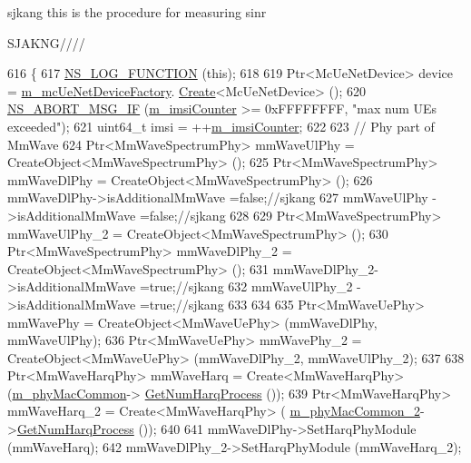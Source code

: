 sjkang this is the procedure for measuring sinr

S\+J\+A\+K\+N\+G//// 
\begin{DoxyCode}
616 \{
617         \hyperlink{log-macros-disabled_8h_a90b90d5bad1f39cb1b64923ea94c0761}{NS\_LOG\_FUNCTION} (\textcolor{keyword}{this});
618 
619         Ptr<McUeNetDevice> device = \hyperlink{classns3_1_1MmWaveHelper_a678f7c6a79f1024bf09a2dc561ae87f5}{m\_mcUeNetDeviceFactory}.
      \hyperlink{classns3_1_1ObjectFactory_a18152e93f0a6fe184ed7300cb31e9896}{Create}<McUeNetDevice> ();
620         \hyperlink{group__fatal_ga6653324225bc139e46deea177614ceee}{NS\_ABORT\_MSG\_IF} (\hyperlink{classns3_1_1MmWaveHelper_a72100c1c951aa5dcc5b634749e2bb930}{m\_imsiCounter} >= 0xFFFFFFFF, \textcolor{stringliteral}{"max num UEs exceeded"});
621         uint64\_t imsi = ++\hyperlink{classns3_1_1MmWaveHelper_a72100c1c951aa5dcc5b634749e2bb930}{m\_imsiCounter};
622 
623         \textcolor{comment}{// Phy part of MmWave}
624         Ptr<MmWaveSpectrumPhy> mmWaveUlPhy = CreateObject<MmWaveSpectrumPhy> ();
625         Ptr<MmWaveSpectrumPhy> mmWaveDlPhy = CreateObject<MmWaveSpectrumPhy> ();
626          mmWaveDlPhy->isAdditionalMmWave =\textcolor{keyword}{false};\textcolor{comment}{//sjkang}
627            mmWaveUlPhy ->isAdditionalMmWave =\textcolor{keyword}{false};\textcolor{comment}{//sjkang}
628 
629         Ptr<MmWaveSpectrumPhy> mmWaveUlPhy\_2 = CreateObject<MmWaveSpectrumPhy> ();
630         Ptr<MmWaveSpectrumPhy> mmWaveDlPhy\_2 = CreateObject<MmWaveSpectrumPhy> ();
631    mmWaveDlPhy\_2->isAdditionalMmWave =\textcolor{keyword}{true};\textcolor{comment}{//sjkang}
632     mmWaveUlPhy\_2 ->isAdditionalMmWave =\textcolor{keyword}{true};\textcolor{comment}{//sjkang}
633 
634 
635         Ptr<MmWaveUePhy> mmWavePhy = CreateObject<MmWaveUePhy> (mmWaveDlPhy, mmWaveUlPhy);
636         Ptr<MmWaveUePhy> mmWavePhy\_2 = CreateObject<MmWaveUePhy> (mmWaveDlPhy\_2, mmWaveUlPhy\_2); 
637 
638         Ptr<MmWaveHarqPhy> mmWaveHarq = Create<MmWaveHarqPhy> (\hyperlink{classns3_1_1MmWaveHelper_a6aaa35de743b9a88998de0128b1046b4}{m\_phyMacCommon}->
      \hyperlink{classns3_1_1MmWavePhyMacCommon_a40773d84172ebeb5aff125f56ebcc5ac}{GetNumHarqProcess} ());
639         Ptr<MmWaveHarqPhy> mmWaveHarq\_2 = Create<MmWaveHarqPhy> (
      \hyperlink{classns3_1_1MmWaveHelper_ab4e9d2f9a49a485dadb3404e8c196f4c}{m\_phyMacCommon\_2}->\hyperlink{classns3_1_1MmWavePhyMacCommon_a40773d84172ebeb5aff125f56ebcc5ac}{GetNumHarqProcess} ());
640 
641         mmWaveDlPhy->SetHarqPhyModule (mmWaveHarq);
642         mmWaveDlPhy\_2->SetHarqPhyModule (mmWaveHarq\_2);

\end{DoxyCode}
